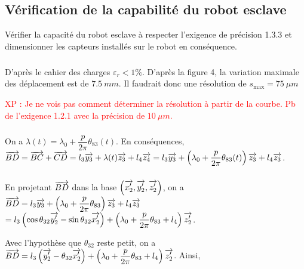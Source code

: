 \documentclass[10pt,fleqn]{article} %
\begin{document}
\subsection{Vérification de la capabilité du robot esclave}
\begin{obj}
Vérifier la capacité du robot esclave à respecter l’exigence de précision 1.3.3 et dimensionner les
capteurs installés sur le robot en conséquence.
\end{obj}


\subparagraph{}%

D'après le cahier des charges $\varepsilon_r<1\%$. 
D'après la figure 4, la variation maximale des déplacement est de $\SI{7,5}{mm}$. Il faudrait donc une résolution de $s_{\text{max}}=\SI{75}{\mu m}$


\textcolor{red}{XP : Je ne vois pas comment déterminer la résolution à partir de la courbe. Pb de l'exigence 1.2.1 avec la précision de $\SI{10}{\mu m}$.}

\subparagraph{}%
On a $\lambda(t)=\lambda_0 + \dfrac{p}{2\pi} \theta_{83}(t)$. 
En conséquences, $\overrightarrow{BD}=\overrightarrow{BC}+\overrightarrow{CD}=l_3\overrightarrow{y_3}+\lambda(t)\overrightarrow{z_3}+l_4\overrightarrow{z_4}
=l_3\overrightarrow{y_3}+\left( \lambda_0 + \dfrac{p}{2\pi} \theta_{83}(t) \right)\overrightarrow{z_3}+l_4\overrightarrow{z_3}$.


\subparagraph{}%



En projetant $\overrightarrow{BD}$ dans la base $\left(\overrightarrow{x_2'},\overrightarrow{y_2'},\overrightarrow{z_2'} \right)$, on a 
 $\overrightarrow{BD}=l_3\overrightarrow{y_3}+\left( \lambda_0 + \dfrac{p}{2\pi} \theta_{83} \right)\overrightarrow{z_3}+l_4\overrightarrow{z_3}$
 $ =l_3\left( \cos \theta_{32} \overrightarrow{y_2'} - \sin\theta_{32} \overrightarrow{x_2'}  \right)+\left( \lambda_0 + \dfrac{p}{2\pi} \theta_{83} +l_4\right)\overrightarrow{z_2'}$.
 
 Avec l'hypothèse que $\theta_{32}$ reste petit, on a  $\overrightarrow{BD}=l_3\left(  \overrightarrow{y_2'} - \theta_{32} \overrightarrow{x_2'}  \right)+\left( \lambda_0 + \dfrac{p}{2\pi} \theta_{83} +l_4\right)\overrightarrow{z_2'}$.
  Ainsi,
  
\end{document}
